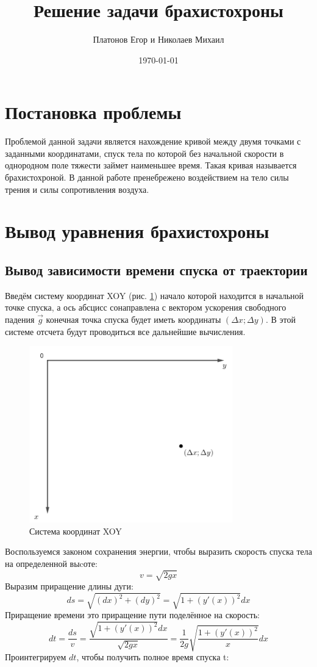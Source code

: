 \documentclass[a4paper, 12pt]{article}
\title{Решение задачи брахистохроны}
\author{Платонов Егор и Николаев Михаил}
\date{\today}
\begin{document}
\maketitle
\section{Постановка проблемы}
Проблемой данной задачи является нахождение кривой между двумя точками с заданными координатами, спуск тела по которой без начальной скорости в однородном поле тяжести займет наименьшее время. Такая кривая называется брахистохроной. В данной работе пренебрежено воздействием на тело силы трения и силы сопротивления воздуха.
\section{Вывод уравнения брахистохроны}
\subsection{Вывод зависимости времени спуска от траектории}
Введём систему координат XOY (рис. \ref{xoy}) начало которой находится в начальной точке спуска, а ось абсцисс сонаправлена с вектором ускорения свободного падения $\overrightarrow{g}$ конечная точка спуска будет иметь координаты $(\Delta x; \Delta y)$. В этой системе отсчета будут проводиться все дальнейшие вычисления.
\begin{figure}[h]
    \centering
    \includegraphics[width=250pt]{xoy.png}
    \caption{Система координат XOY}
    \label{xoy}
\end{figure}

Воспользуемся законом сохранения энергии, чтобы выразить скорость спуска тела на определенной выcоте:
\[ v = \sqrt{2gx}\]
Выразим приращение длины дуги:
\begin{equation}
    ds = \sqrt{(dx)^2+(dy)^2} = \sqrt{1+(y'(x))^2} dx
    \label{ds}
\end{equation}
Приращение времени это приращение пути поделённое на скорость:
\[ dt = \frac{ds}{v} = \frac{\sqrt{1+(y'(x))^2} dx}{\sqrt{2gx}} = \frac{1}{2g} \sqrt{\frac{1+(y'(x))^2}{x}}dx\]
Проинтегрируем $dt$, чтобы получить полное время спуска t:
\end{document}
